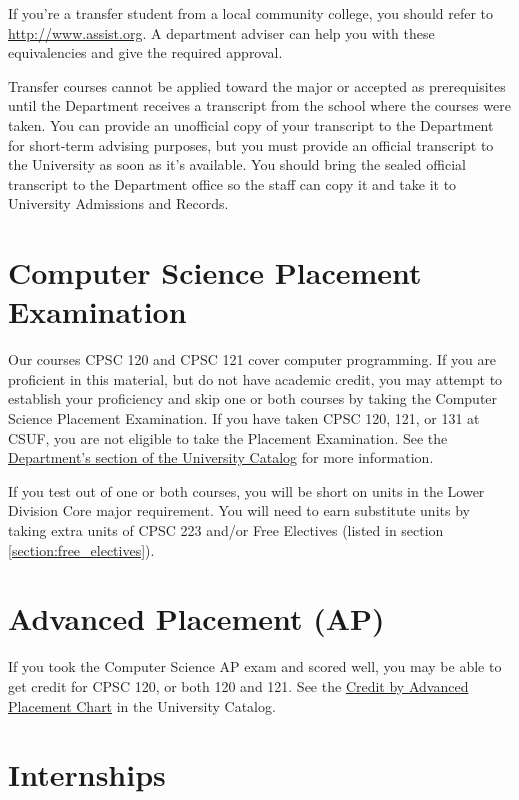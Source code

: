 \documentclass{book}
\newcommand{\CampusName}{CSUF}
\begin{document}
If you're a transfer student from a local community college, you should refer to \url{http://www.assist.org}. A department adviser can help you with these equivalencies and give the required approval.

Transfer courses cannot be applied toward the major or accepted as prerequisites until the Department receives a transcript from the school where the courses were taken. You can provide an unofficial copy of your transcript to the Department for short-term advising purposes, but you must provide an official transcript to the University as soon as it's available. You should bring the sealed official transcript to the Department office so the staff can copy it and take it to University Admissions and Records.

\section{Computer Science Placement Examination}
\label{section:placement}
Our courses CPSC 120 and CPSC 121 cover computer programming. If you are proficient in this material, but do not have academic credit, you may attempt to establish your proficiency and skip one or both courses by taking the Computer Science Placement Examination. If you have taken CPSC 120, 121, or 131 at \CampusName, you are not eligible to take the Placement Examination. See the \href{http://catalog.fullerton.edu/preview_program.php?catoid=2&poid=537&returnto=137}{Department's section of the University Catalog} for more information.

If you test out of one or both courses, you will be short on units in the Lower Division Core major requirement. You will need to earn substitute units by taking extra units of CPSC 223 and/or Free Electives (listed in section \ref{section:free_electives}).

\section{Advanced Placement (AP)}
\label{section:ap}
If you took the Computer Science AP exam and scored well, you may be able to get credit for CPSC 120, or both 120 and 121. See the \href{http://catalog.fullerton.edu/content.php?catoid=2&navoid=153#Credit%20by%20Advanced%20Placement%20Chart}{Credit by Advanced Placement Chart} in the University Catalog.

\section{Internships}
\end{document}
